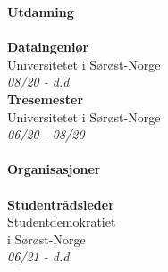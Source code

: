 \documentclass[a4paper, 12pt]{article}
\begin{document}
    \begin{minipage}[t]{0.3\textwidth}
        \Large\textbf{Utdanning}\\\\
        \normalsize\textbf{Dataingeniør}\\
        \small{Universitetet i Sørøst-Norge}\\
        \small \textit{08/20 - d.d} \\

        \normalsize\textbf{Tresemester}\\
        \small{Universitetet i Sørøst-Norge}\\
        \small \textit{06/20 - 08/20}\\\\
        \horizontalline{2cm}{0.4cm}
        \Large\textbf{Organisasjoner}\\\\
        \normalsize\textbf{Studentrådsleder}\\
        \small{Studentdemokratiet \\i Sørøst-Norge}\\
        \small{\textit{06/21 - d.d}}\\


\end{minipage}
\end{document}
